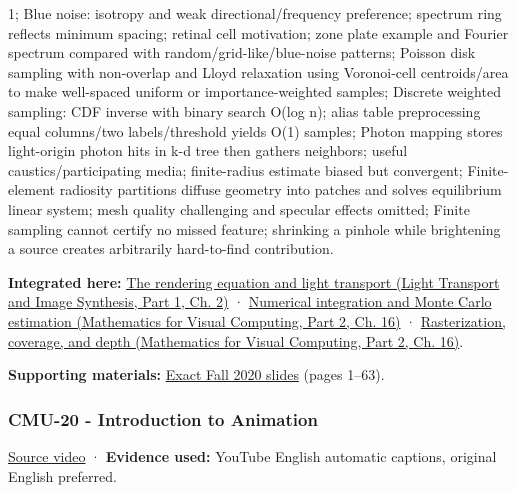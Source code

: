 1; Blue noise: isotropy and weak directional/frequency preference; spectrum ring reflects minimum spacing; retinal cell motivation; zone plate example and Fourier spectrum compared with random/grid-like/blue-noise patterns; Poisson disk sampling with non-overlap and Lloyd relaxation using Voronoi-cell centroids/area to make well-spaced uniform or importance-weighted samples; Discrete weighted sampling: CDF inverse with binary search O(log n); alias table preprocessing equal columns/two labels/threshold yields O(1) samples; Photon mapping stores light-origin photon hits in k-d tree then gathers neighbors; useful caustics/participating media; finite-radius estimate biased but convergent; Finite-element radiosity partitions diffuse geometry into patches and solves equilibrium linear system; mesh quality challenging and specular effects omitted; Finite sampling cannot certify no missed feature; shrinking a pinhole while brightening a source creates arbitrarily hard-to-find contribution.

\textbf{Integrated here:} \href{../04-Light-Transport-and-Image-Synthesis-P01/main.pdf\#nameddest=03-visual-computing-i-ch007-the-rendering-equation-and-light-transport}{The rendering equation and light transport (Light Transport and Image Synthesis, Part 1, Ch. 2)} · \href{../02-Mathematics-for-Visual-Computing-P02/main.pdf\#nameddest=03-visual-computing-i-ch012-numerical-integration-and-monte-carlo-estimation}{Numerical integration and Monte Carlo estimation (Mathematics for Visual Computing, Part 2, Ch. 16)} · \href{../02-Mathematics-for-Visual-Computing-P02/main.pdf\#nameddest=03-visual-computing-i-ch012-rasterization-coverage-and-depth}{Rasterization, coverage, and depth (Mathematics for Visual Computing, Part 2, Ch. 16)}.

\textbf{Supporting materials:} \href{https://15462.courses.cs.cmu.edu/fall2020content/lectures/19_variancereduction/19_variancereduction_slides.pdf}{Exact Fall 2020 slides} (pages 1--63).

\subsubsection{CMU-20 - Introduction to Animation}\label{04-visual-computing-ii-ch036-cmu-20---introduction-to-animation}

\hypertarget{04-visual-computing-ii-ch036-cmu-20---introduction-to-animation}{}

\href{https://www.youtube.com/watch?v=XVTw68iHef0}{Source video} · \textbf{Evidence used:} YouTube English automatic captions, original English preferred.

